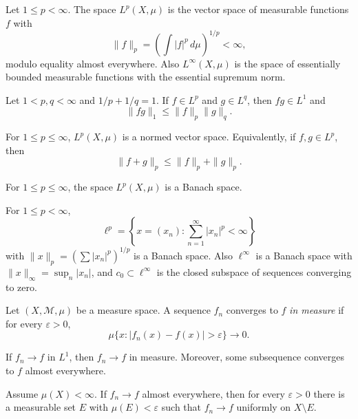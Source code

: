 \begin{definition}
\label{definition-lp-space}
Let $1\leq p<\infty$. The space $L^p(X,\mu)$
is the vector space of measurable functions
$f$ with
$$
\|f\|_p = \left(\int
|f|^p\,d\mu\right)^{1/p}<\infty,
$$
modulo equality almost everywhere. Also
$L^\infty(X,\mu)$ is the space of essentially
bounded measurable functions with the
essential supremum norm.
\end{definition}

\begin{theorem}
\label{theorem-holder-inequality}
Let $1<p,q<\infty$ and $1/p+1/q=1$. If $f\in
L^p$ and $g\in L^q$, then $fg\in L^1$ and
$$
\|fg\|_1\leq \|f\|_p\|g\|_q.
$$
\end{theorem}

\begin{theorem}
\label{theorem-minkowski-inequality}
For $1\leq p\leq\infty$, $L^p(X,\mu)$ is a
normed vector space. Equivalently, if $f,g\in
L^p$, then
$$
\|f+g\|_p\leq \|f\|_p+\|g\|_p.
$$
\end{theorem}

\begin{theorem}
\label{theorem-lp-banach}
For $1\leq p\leq\infty$, the space
$L^p(X,\mu)$ is a Banach space.
\end{theorem}

\begin{example}
\label{example-sequence-lp}
For $1\leq p<\infty$,
$$
\ell^p = \left\{x=(x_n):\sum_{n=1}^\infty
|x_n|^p<\infty\right\}
$$
with $\|x\|_p=(\sum |x_n|^p)^{1/p}$ is a
Banach space. Also $\ell^\infty$ is a Banach
space with $\|x\|_\infty=\sup_n |x_n|$, and
$c_0\subset\ell^\infty$ is the closed
subspace of sequences converging to zero.
\end{example}

\begin{definition}
\label{definition-convergence-in-measure}
Let $(X,\mathcal M,\mu)$ be a measure space.
A sequence $f_n$ converges to $f$ {\it in
measure} if for every $\varepsilon>0$,
$$
\mu\{x: |f_n(x)-f(x)|>\varepsilon\}\to 0.
$$
\end{definition}

\begin{theorem}
\label{%
theorem-l1-convergence-implies-measure}
If $f_n\to f$ in $L^1$, then $f_n\to f$ in
measure. Moreover, some subsequence converges
to $f$ almost everywhere.
\end{theorem}

\begin{theorem}[Egoroff]
\label{theorem-egoroff}
Assume $\mu(X)<\infty$. If $f_n\to f$ almost
everywhere, then for every $\varepsilon>0$
there is a measurable set $E$ with
$\mu(E)<\varepsilon$ such that $f_n\to f$
uniformly on $X\setminus E$.
\end{theorem}

